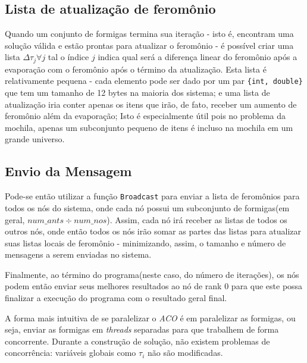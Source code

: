 \subsection{Lista de atualização de feromônio}
Quando um conjunto de formigas termina sua iteração - isto é, encontram uma solução válida e estão prontas para atualizar o feromônio - é possível criar uma lista $\Delta\tau_j \forall{j}$ tal o índice $j$ indica qual será a diferença linear do feromônio após a evaporação com o feromônio após o término da atualização. Esta lista é relativamente pequena - cada elemento pode ser dado por um par \texttt{\{int, double\}} que tem um tamanho de 12 bytes na maioria dos sistema; e uma lista de atualização iria conter apenas os itens que irão, de fato, receber um aumento de feromônio além da evaporação; Isto é especialmente útil pois no problema da mochila, apenas um subconjunto pequeno de itens é incluso na mochila em um grande universo.

\subsection{Envio da Mensagem}
Pode-se então utilizar a função \texttt{Broadcast} para enviar a lista de feromônios para todos os nós do sistema, onde cada nó possui um subconjunto de formigas(em geral, ${num\_ants}\div{num\_nos}$). Assim, cada nó irá receber as listas de todos os outros nós, onde então todos os nós irão somar as partes das listas para atualizar suas listas locais de feromônio - minimizando, assim, o tamanho e número de mensagens a serem enviadas no sistema.

Finalmente, ao término do programa(neste caso, do número de iterações), os nós podem então enviar seus melhores resultados ao nó de rank $0$ para que este possa finalizar a execução do programa com o resultado geral final.





A forma mais intuitiva de se paralelizar o \textit{ACO} é em paralelizar as formigas, ou seja, enviar as formigas em \textit{threads} separadas para que trabalhem de forma concorrente. Durante a construção de solução, não existem problemas de concorrência: variáveis globais como $\tau_i$ não são modificadas.


